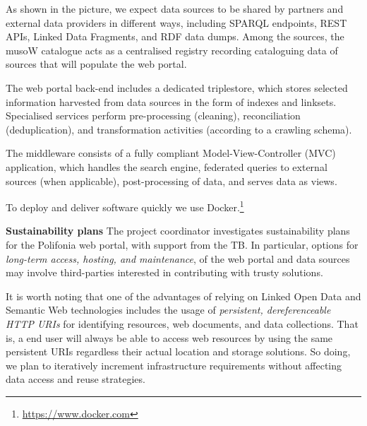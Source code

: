 
As shown in the picture, we expect data sources to be shared by partners and external data providers in different ways, including SPARQL endpoints, REST APIs, Linked Data Fragments, and RDF data dumps. Among the sources, the musoW catalogue acts as a centralised registry recording cataloguing data of sources that will populate the web portal. 

The web portal back-end includes a dedicated triplestore, which stores selected information harvested from data sources in the form of indexes and linksets. Specialised services perform pre-processing (cleaning), reconciliation (deduplication), and transformation activities (according to a crawling schema). 

The middleware consists of a fully compliant Model-View-Controller (MVC) application, which handles the search engine, federated queries to external sources (when applicable), post-processing of data, and serves data as views.

To deploy and deliver software quickly we use Docker.\footnote{\url{https://www.docker.com}}

\textbf{Sustainability plans} The project coordinator investigates sustainability plans for the Polifonia web portal, with support from the TB. In particular, options for \emph{long-term access, hosting, and maintenance}, of the web portal and data sources may involve third-parties interested in contributing with trusty solutions. 

It is worth noting that one of the advantages of relying on Linked Open Data and Semantic Web technologies includes the usage of \emph{persistent, dereferenceable HTTP URIs} for identifying resources, web documents, and data collections. That is, a end user will always be able to access web resources by using the same persistent URIs regardless their actual location and storage solutions. So doing, we plan to iteratively increment infrastructure requirements without affecting data access and reuse strategies.


